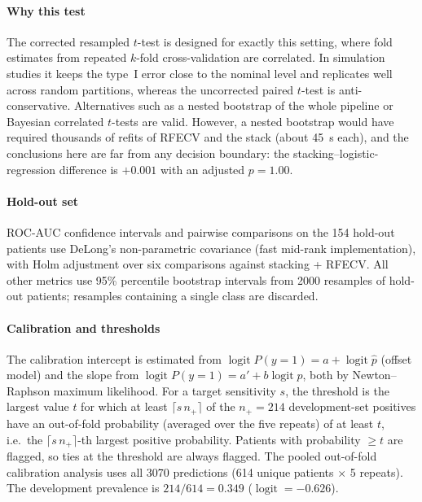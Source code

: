 \documentclass[11pt]{article}
\begin{document}
\paragraph{Why this test}
The corrected resampled $t$-test is designed for exactly this setting, where fold estimates from repeated $k$-fold cross-validation are correlated. In simulation studies it keeps the type~I error close to the nominal level and replicates well across random partitions, whereas the uncorrected paired $t$-test is anti-conservative. Alternatives such as a nested bootstrap of the whole pipeline or Bayesian correlated $t$-tests are valid. However, a nested bootstrap would have required thousands of refits of RFECV and the stack (about 45~s each), and the conclusions here are far from any decision boundary: the stacking--logistic-regression difference is $+0.001$ with an adjusted $p = 1.00$.

\paragraph{Hold-out set}
ROC-AUC confidence intervals and pairwise comparisons on the 154 hold-out patients use DeLong's non-parametric covariance (fast mid-rank implementation), with Holm adjustment over six comparisons against stacking + RFECV. All other metrics use 95\% percentile bootstrap intervals from 2000 resamples of hold-out patients; resamples containing a single class are discarded.

\paragraph{Calibration and thresholds}
The calibration intercept is estimated from $\operatorname{logit} P(y=1) = a + \operatorname{logit}\hat p$ (offset model) and the slope from $\operatorname{logit} P(y=1) = a' + b\operatorname{logit}\hat p$, both by Newton--Raphson maximum likelihood. For a target sensitivity $s$, the threshold is the largest value $t$ for which at least $\lceil s\,n_+\rceil$ of the $n_+ = 214$ development-set positives have an out-of-fold probability (averaged over the five repeats) of at least $t$, i.e.\ the $\lceil s\,n_+\rceil$-th largest positive probability. Patients with probability $\geq t$ are flagged, so ties at the threshold are always flagged. The pooled out-of-fold calibration analysis uses all 3070 predictions (614 unique patients $\times$ 5 repeats). The development prevalence is $214/614 = 0.349$ ($\operatorname{logit} = -0.626$).
\end{document}
